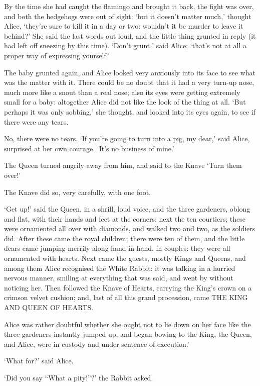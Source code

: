 \documentclass[statementpaper,twoside,openany]{memoir}
\begin{document}
By the time she had caught the flamingo and brought it back, the fight was over, and both the hedgehogs were out of sight: `but it doesn't matter much,' thought Alice, `they're sure to kill it in a day or two: wouldn't it be murder to leave it behind?' She said the last words out loud, and the little thing grunted in reply (it had left off sneezing by this time). `Don't grunt,' said Alice; `that's not at all a proper way of expressing yourself.'

The baby grunted again, and Alice looked very anxiously into its face to see what was the matter with it. There could be no doubt that it had a very turn-up nose, much more like a snout than a real nose; also its eyes were getting extremely small for a baby: altogether Alice did not like the look of the thing at all. `But perhaps it was only sobbing,' she thought, and looked into its eyes again, to see if there were any tears.

No, there were no tears. `If you're going to turn into a pig, my dear,' said Alice, surprised at her own courage. `It's no business of mine.'

The Queen turned angrily away from him, and said to the Knave `Turn them over!'

The Knave did so, very carefully, with one foot.

`Get up!' said the Queen, in a shrill, loud voice, and the three gardeners, oblong and flat, with their hands and feet at the corners: next the ten courtiers; these were ornamented all over with diamonds, and walked two and two, as the soldiers did. After these came the royal children; there were ten of them, and the little dears came jumping merrily along hand in hand, in couples: they were all ornamented with hearts. Next came the guests, mostly Kings and Queens, and among them Alice recognised the White Rabbit: it was talking in a hurried nervous manner, smiling at everything that was said, and went by without noticing her. Then followed the Knave of Hearts, carrying the King's crown on a crimson velvet cushion; and, last of all this grand procession, came THE KING AND QUEEN OF HEARTS.

Alice was rather doubtful whether she ought not to lie down on her face like the three gardeners instantly jumped up, and began bowing to the King, the Queen, and Alice, were in custody and under sentence of execution.'

`What for?' said Alice.

`Did you say ``What a pity!''?' the Rabbit asked.
\end{document}
